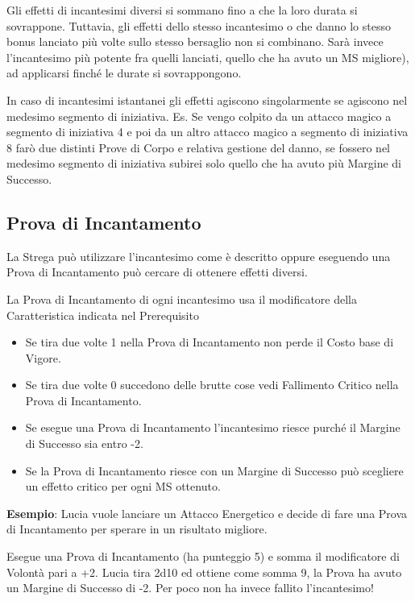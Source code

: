 \documentclass[12pt,a4paper,twoside,openany]{book}
\begin{document}
\begin{multicols}{2}
Gli effetti di incantesimi diversi si sommano fino a che la loro durata si sovrappone. Tuttavia, gli effetti dello stesso incantesimo o che danno lo stesso bonus lanciato più volte sullo stesso bersaglio non si combinano. Sarà invece l'incantesimo più potente fra quelli lanciati, quello che ha avuto un MS migliore), ad applicarsi finché le durate si sovrappongono.

In caso di incantesimi istantanei gli effetti agiscono singolarmente se agiscono nel medesimo segmento di iniziativa. Es. Se vengo colpito da un attacco magico a segmento di iniziativa 4 e poi da un altro attacco magico a segmento di iniziativa 8 farò due distinti Prove di Corpo e relativa gestione del danno, se fossero nel medesimo segmento di iniziativa subirei solo quello che ha avuto più Margine di Successo.

\subsection{Prova di Incantamento}

La Strega può utilizzare l'incantesimo come è descritto oppure eseguendo una Prova di Incantamento può cercare di ottenere effetti diversi.

La Prova di Incantamento di ogni incantesimo usa il modificatore della Caratteristica indicata nel Prerequisito

\begin{itemize}

\item
Se tira due volte 1 nella Prova di Incantamento non perde il Costo base di Vigore.

\item
Se tira due volte 0 succedono delle brutte cose vedi Fallimento Critico nella Prova di Incantamento.

\item
Se esegue una Prova di Incantamento l'incantesimo riesce purché il Margine di Successo sia entro -2.

\item
Se la Prova di Incantamento riesce con un Margine di Successo può scegliere un effetto critico per ogni MS ottenuto.

\end{itemize}

\textbf{Esempio}: Lucia vuole lanciare un Attacco Energetico e decide di fare una Prova di Incantamento per sperare in un risultato migliore.

Esegue una Prova di Incantamento (ha punteggio 5) e somma il modificatore di Volontà pari a +2.
Lucia tira 2d10 ed ottiene come somma 9, la Prova ha avuto un Margine di Successo di -2. Per poco non ha invece fallito l'incantesimo!


\end{multicols}
\end{document}

